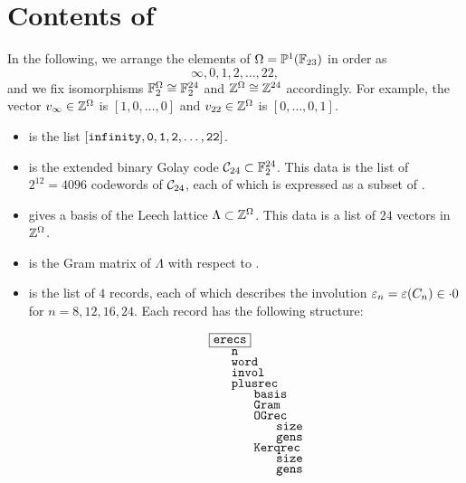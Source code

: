 \documentclass{amsart} %
\newcommand{\ttbox}[1]{\makebox[0pt][l]{{\tt #1}}}
\newcommand{\ttfbox}[1]{\makebox[0pt][l]{\fbox{\tt #1}}}
\newcommand{\pt}{p{.2cm}}
\begin{document}
\section{Contents of }
%
In the following, we arrange the elements of $\Omega=\mathord{\mathbb{P}}^1(\mathord{\mathbb{F}}_{23})$ in order as 
\[
\infty, 0, 1,2 , \dots, 22, 
\]
and we  fix isomorphisms  
$\mathord{\mathbb{F}}_2^{\Omega}\cong \mathord{\mathbb{F}}_2^{24}$ and  $\mathord{\mathbb{Z}}^{\Omega}\cong \mathord{\mathbb{Z}}^{24}$
accordingly.
For example, the vector $v_{\infty}\in \mathord{\mathbb{Z}}^{\Omega}$ is $[1, 0, \dots, 0]$
and $v_{22}\in \mathord{\mathbb{Z}}^{\Omega}$ is $[0, \dots, 0, 1]$.
%
\begin{itemize}
%
\item {} is the list
$\tt{[infinity, 0,1,2,\dots, 22]}$.
%
 \item {} is the extended binary Golay code $\mathord{\mathcal{C}}_{24}\subset \mathord{\mathbb{F}}_2^{24}$.
This data is the list of $2^{12}=4096$ codewords of $\mathord{\mathcal{C}}_{24}$,
each of which 
is expressed as a subset of .
%
\item {} gives a basis of the Leech lattice $\Lambda\subset \mathord{\mathbb{Z}}^{\Omega}$.
This data 
is a list of $24$ vectors in $\mathord{\mathbb{Z}}^{\Omega}$.
%
\item {} is the Gram matrix of  $\Lambda$
with respect to .
%
\item {} is the list of $4$ records,
each of which describes the involution $\varepsilon_n=\varepsilon(C_n)\in \cdot 0$
for $n=8, 12, 16, 24$.
Each record  has the following structure:
\par
\[
{
\renewcommand{\arraystretch}{.7}
\begin{tabular}{\pt \pt \pt \pt}
\ttfbox{erecs} &&& \\
& \ttbox{n} && \\
& \ttbox{word} && \\
& \ttbox{invol} && \\
%
& \ttbox{plusrec} && \\
&& \ttbox{basis} & \\
&& \ttbox{Gram} & \\
&& \ttbox{OGrec} & \\
&&& \ttbox{size}  \\
&&& \ttbox{gens}  \\
&& \ttbox{Kerqrec} & \\
&&& \ttbox{size}  \\
&&& \ttbox{gens}  \\

\end{tabular}}\]
\end{itemize}
\end{document}
